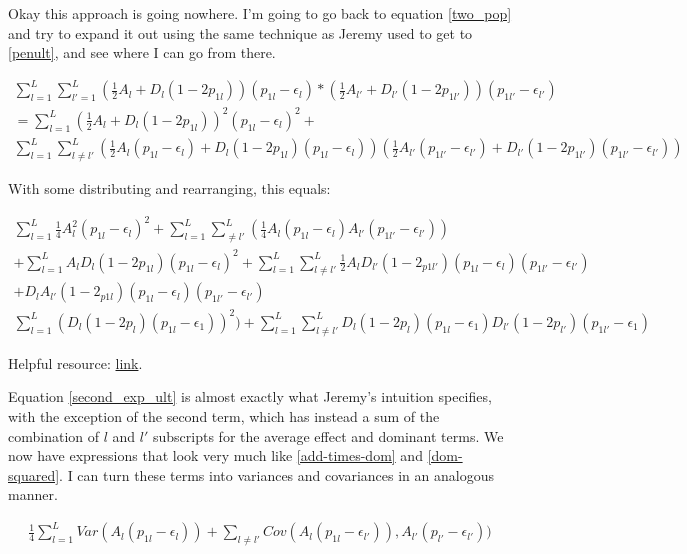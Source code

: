 \documentclass[a4paper,10pt]{article}
\begin{document}
Okay this approach is going nowhere. I'm going to go back to equation
\eqref{two_pop} and try to expand it out using the same technique as
Jeremy used to get to \eqref{penult}, and see where I can go from
there.


\begin{equation}
  \begin{split}
    \sum^L_{l=1} \sum^L_{l'=1}(\frac{1}{2}A_l +
    D_l(1-2p_{1l}))(p_{1l}-\epsilon_l)*(\frac{1}{2}A_{l'} +
    D_{l'}(1-2p_{1l'}))(p_{1l'}-\epsilon_{l'}) \\
    =\sum^L_{l=1}(\frac{1}{2}A_l+D_l(1-2p_{1l}))^2(p_{1l}-\epsilon_l)^2+ \\
    \sum^L_{l=1}\sum^L_{l \neq
    l'}(\frac{1}{2}A_l(p_{1l}-\epsilon_l)+D_l(1-2p_{1l})(p_{1l}-\epsilon_l))(\frac{1}{2}A_{l'}(p_{1l'}-\epsilon_{l'})+D_{l'}(1-2p_{1l'})(p_{1l'}-\epsilon_{l'})) \label{second_expansion_penult}
  \end{split}
\end{equation} 

With some distributing and rearranging, this equals: 

\begin{equation}
  \begin{split}
  \sum^L_{l=1}\frac{1}{4}A_l^2(p_{1l}-\epsilon_l)^2+\sum^L_{l=1}\sum^L_{
    \neq
    l'}(\frac{1}{4}A_l(p_{1l}-\epsilon_{l})A_{l'}(p_{1l'}-\epsilon_{l'}))
  \\
  +\sum^L_{l=1}A_lD_l(1-2p_{1l})(p_{1l}-\epsilon_l)^2 +
  \sum^L_{l=1}\sum^L_{l \neq
    l'}\frac{1}{2}A_lD_{l'}(1-2_{p1l'})(p_{1l}-\epsilon_l)(p_{1l'}-\epsilon_{l'}) \\
  +D_lA_{l'}(1-2_{p1l})(p_{1l}-\epsilon_l)(p_{1l'}-\epsilon_{l'}) \\
   \sum^L_{l=1}(D_l(1-2p_l)(p_{1l}-\epsilon_{1}))^2)
   + \sum^L_{l=1}\sum^L_{l\neq
     l'}D_{l}(1-2p_{l})(p_{1l}-\epsilon_{1})D_{l'}(1-2p_{l'})(p_{1l'}-\epsilon_{1}) \label{second_exp_ult}
  \end{split}
\end{equation}

Helpful resource:
\href{http://www.statpower.net/Content/310/Summation%20Algebra.pdf}{link}.  

Equation \eqref{second_exp_ult} is almost exactly what Jeremy's
intuition specifies, with the exception of the second term, which
has instead a sum of the combination of $l$ and $l'$ subscripts for
the average effect and dominant terms. We now have expressions that
look very much like \eqref{add-times-dom} and \eqref{dom-squared}. I
can turn these terms into variances and covariances in an analogous
manner.

\begin{equation}
  \begin{split}
\frac{1}{4}\sum^L_{l=1}Var(A_l(p_{1l}-\epsilon_l)) + \sum_{l \neq
  l'}Cov(A_l(p_{1l}-\epsilon_{l'})), A_{l'}(p_{l'}-\epsilon_{l'}))
  \end{split}
\end{equation}

    


\end{document}
